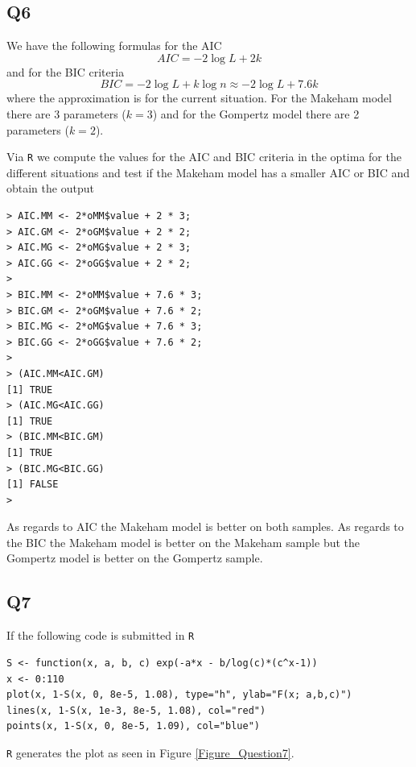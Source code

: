 \subsection*{Q6}

We have the following formulas for the AIC
\begin{equation}
AIC = -2 \log L + 2k
\end{equation}
and for the BIC criteria 
\begin{equation}
BIC = -2 \log L + k \log n \approx -2 \log L + 7.6k
\end{equation}
where the approximation is for the current situation. For the Makeham model there are 3 parameters ($k = 3$) and for the Gompertz model there are 2 parameters ($k=2$).

Via \verb|R| we compute the values for the AIC and BIC criteria in the optima for the different situations and test if the Makeham model has a smaller AIC or BIC and obtain the output
\begin{verbatim}
> AIC.MM <- 2*oMM$value + 2 * 3;
> AIC.GM <- 2*oGM$value + 2 * 2;
> AIC.MG <- 2*oMG$value + 2 * 3;
> AIC.GG <- 2*oGG$value + 2 * 2;
> 
> BIC.MM <- 2*oMM$value + 7.6 * 3;
> BIC.GM <- 2*oGM$value + 7.6 * 2;
> BIC.MG <- 2*oMG$value + 7.6 * 3;
> BIC.GG <- 2*oGG$value + 7.6 * 2;
> 
> (AIC.MM<AIC.GM)
[1] TRUE
> (AIC.MG<AIC.GG)
[1] TRUE
> (BIC.MM<BIC.GM)
[1] TRUE
> (BIC.MG<BIC.GG)
[1] FALSE
> 
\end{verbatim}

As regards to AIC the Makeham model is better on both samples. As regards to the BIC the Makeham model is better on the Makeham sample but the Gompertz model is better on the Gompertz sample.

\subsection*{Q7}

If the following code is submitted in \verb|R|

\begin{verbatim}
S <- function(x, a, b, c) exp(-a*x - b/log(c)*(c^x-1))
x <- 0:110
plot(x, 1-S(x, 0, 8e-5, 1.08), type="h", ylab="F(x; a,b,c)")
lines(x, 1-S(x, 1e-3, 8e-5, 1.08), col="red")
points(x, 1-S(x, 0, 8e-5, 1.09), col="blue")
\end{verbatim}
\verb|R| generates the plot as seen in Figure \ref{Figure_Question7}.

